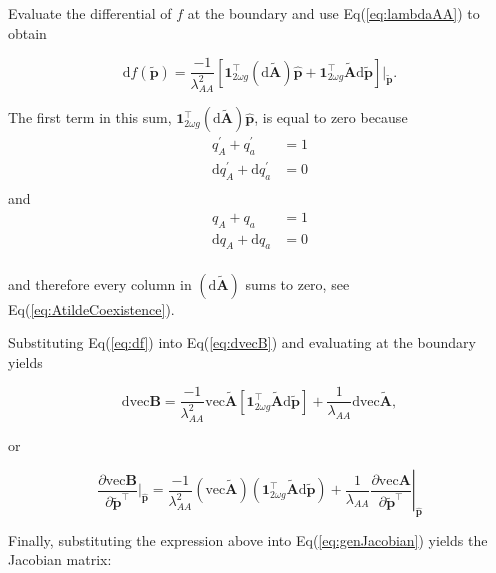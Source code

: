 \documentclass[11pt]{article}
\def\mbf#1{\mathbf{#1}}
\begin{document}
Evaluate the differential of $f$ at the boundary and use Eq(\ref{eq:lambdaAA}) to obtain

\begin{equation} \label{eq:df}
	\text{d} f(\tilde{\mbf{p}}) = \frac{ -1 }{\lambda_{AA}^2 } \left[ \mbf{1}^{\intercal}_{2 \omega g} \left( \text{d} \tilde{\mbf{A}} \right) \hat{\mbf{p}} + \mbf{1}^{\intercal}_{2 \omega g} \tilde{\mbf{A}} \text{d} \tilde{\mbf{p}} \right] \bigg\rvert_{\tilde{\mbf{p}}}.
\end{equation}

The first term in this sum, $\mbf{1}^{\intercal}_{2 \omega g} \left( \text{d} \tilde{\mbf{A}} \right) \hat{\mbf{p}}$, is equal to zero because
\begin{align*}
	q^{\prime}_A + q^{\prime}_a &= 1 \\
	\text{d}q^{\prime}_A + \text{d}q^{\prime}_a &= 0 \\
\end{align*}
\noindent and
\begin{align*}
	q_A + q_a &= 1 \\
	\text{d}q_A + \text{d}q_a &= 0 \\
\end{align*}

\noindent and therefore every column in $\left( \text{d} \tilde{\mbf{A}} \right)$ sums to zero, see Eq(\ref{eq:AtildeCoexistence}).

Substituting Eq(\ref{eq:df}) into Eq(\ref{eq:dvecB}) and evaluating at the boundary yields

\begin{equation} \label{eq:dvecBsubs}
	\text{dvec} \mbf{B} = \frac{ -1 }{\lambda_{AA}^2 } \text{vec} \tilde{\mbf{A}} \left[ \mbf{1}^{\intercal}_{2 \omega g} \tilde{\mbf{A}} \text{d} \tilde{\mbf{p}} \right] + \frac{ 1 }{\lambda_{AA} } \text{dvec} \tilde{\mbf{A}},
\end{equation}

\noindent or 

\begin{equation}
	\frac{\partial \text{vec} \mbf{B}} {\partial \tilde{\mbf{p}}^{\intercal}} \bigg\rvert_{\hat{\mbf{p}}} = \frac{ -1 }{\lambda_{AA}^2 } \left( \text{vec} \tilde{\mbf{A}} \right) \left( \mbf{1}^{\intercal}_{2 \omega g} \tilde{\mbf{A}} \text{d} \tilde{\mbf{p}} \right) + \frac{ 1 }{\lambda_{AA} } \left. \frac{\partial \text{vec} \mbf{A}} {\partial \tilde{\mbf{p}}^{\intercal}} \right|_{\hat{\mbf{p}}}
\end{equation}

\noindent Finally, substituting the expression above into Eq(\ref{eq:genJacobian}) yields the Jacobian matrix:
\end{document}
